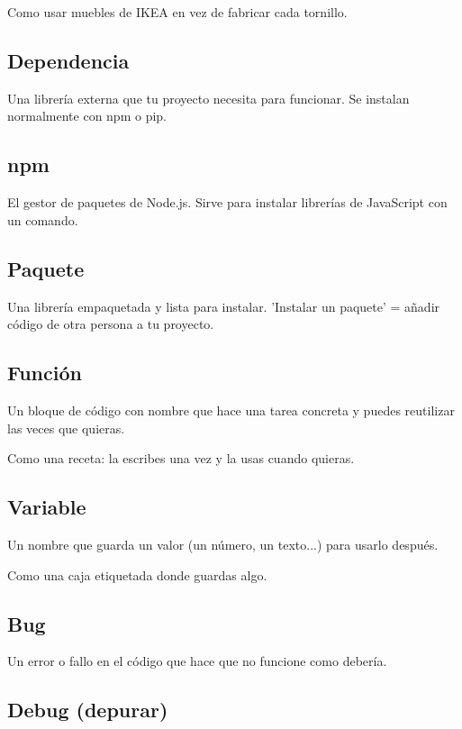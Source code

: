 \documentclass[11pt,a4paper]{report}
\begin{document}
Como usar muebles de IKEA en vez de fabricar cada tornillo.

\subsection{Dependencia}

Una librería externa que tu proyecto necesita para funcionar. Se instalan normalmente con npm o pip.

\subsection{npm}

El gestor de paquetes de Node.js. Sirve para instalar librerías de JavaScript con un comando.

\subsection{Paquete}

Una librería empaquetada y lista para instalar. 'Instalar un paquete' = añadir código de otra persona a tu proyecto.

\subsection{Función}

Un bloque de código con nombre que hace una tarea concreta y puedes reutilizar las veces que quieras.

Como una receta: la escribes una vez y la usas cuando quieras.

\subsection{Variable}

Un nombre que guarda un valor (un número, un texto...) para usarlo después.

Como una caja etiquetada donde guardas algo.

\subsection{Bug}

Un error o fallo en el código que hace que no funcione como debería.

\subsection{Debug (depurar)}
\end{document}
